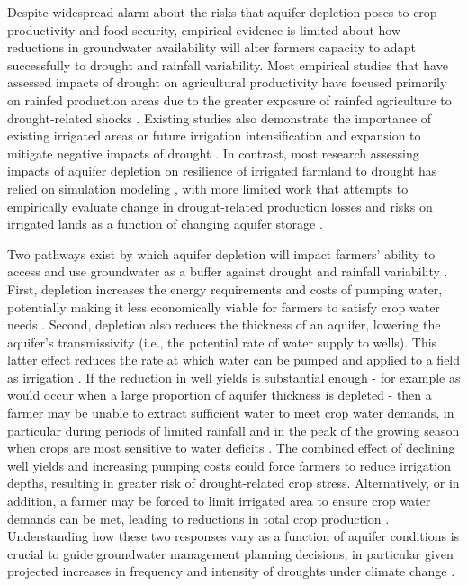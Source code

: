 \documentclass[
]{article}
\begin{document}
Despite widespread alarm about the risks that aquifer depletion poses to crop productivity and food security, empirical evidence is limited about how reductions in groundwater availability will alter farmers capacity to adapt successfully to drought and rainfall variability. Most empirical studies that have assessed impacts of drought on agricultural productivity have focused primarily on rainfed production areas due to the greater exposure of rainfed agriculture to drought-related shocks \citep{schlenker2009nonlinear, lobell2014greater, schlenker2010robust, zhou2020connections, borgomeo2020impact}. Existing studies also demonstrate the importance of existing irrigated areas or future irrigation intensification and expansion to mitigate negative impacts of drought \citep{kuwayama2019estimating, zipper2016drought, zhu2022untangling, zhu2022warming, lu2020mapping, davis2019sensitivity, li2018changes}. In contrast, most research assessing impacts of aquifer depletion on resilience of irrigated farmland to drought has relied on simulation modeling \citep{foster2015well, cotterman2018groundwater, kahil2015modeling, yoon2021coupled, rad2020mod}, with more limited work that attempts to empirically evaluate change in drought-related production losses and risks on irrigated lands as a function of changing aquifer storage \citep{jain2021groundwater, suter2021depletion}.

Two pathways exist by which aquifer depletion will impact farmers' ability to access and use groundwater as a buffer against drought and rainfall variability \citep{foster2015analysis}. First, depletion increases the energy requirements and costs of pumping water, potentially making it less economically viable for farmers to satisfy crop water needs \citep{mieno2017price, bhattarai2021impact}. Second, depletion also reduces the thickness of an aquifer, lowering the aquifer's transmissivity (i.e., the potential rate of water supply to wells). This latter effect reduces the rate at which water can be pumped and applied to a field as irrigation \citep{konikow2005groundwater, foster2014modeling, hrozencik2017heterogeneous}. If the reduction in well yields is substantial enough - for example as would occur when a large proportion of aquifer thickness is depleted \citep{hecox2002calculation, korus2020depletion} - then a farmer may be unable to extract sufficient water to meet crop water demands, in particular during periods of limited rainfall and in the peak of the growing season when crops are most sensitive to water deficits \citep{foster2015well,rouhi2020downside}. The combined effect of declining well yields and increasing pumping costs could force farmers to reduce irrigation depths, resulting in greater risk of drought-related crop stress. Alternatively, or in addition, a farmer may be forced to limit irrigated area to ensure crop water demands can be met, leading to reductions in total crop production \citep{foster2014modeling, rad2020effects}. Understanding how these two responses vary as a function of aquifer conditions is crucial to guide groundwater management planning decisions, in particular given projected increases in frequency and intensity of droughts under climate change \citep{ukkola2020robust, chiang2021evidence, cook2020twenty}.
\end{document}
